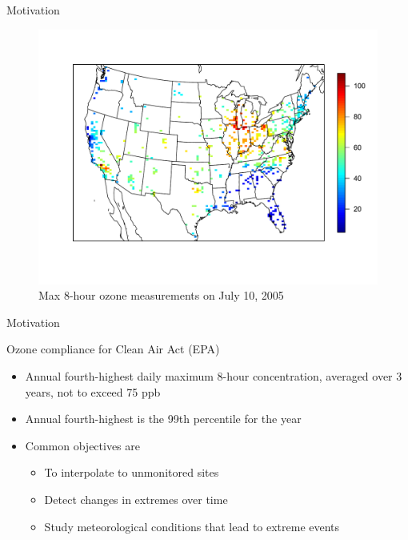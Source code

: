 \documentclass{beamer}
\begin{document}
 \begin{frame}{Motivation}
   \centering
   \begin{figure}
     \includegraphics[width=\linewidth, trim=0 1in 0 1in ]{ozone-10jul-us}
     \caption{Max 8-hour ozone measurements on July 10, 2005}
    \end{figure}
 \end{frame}

 \begin{frame}{Motivation}
 \begin{adjustwidth}{1em}{0em}
   Ozone compliance for Clean Air Act (EPA) \vspace{1em}
   \begin{itemize} \setlength{\itemsep}{1em}
     \item Annual fourth-highest daily maximum 8-hour concentration, averaged over 3 years, not to exceed 75 ppb
     \item Annual fourth-highest is the 99th percentile for the year
     \item Common objectives are \vspace{0.5em}
     \begin{itemize} \setlength{\itemsep}{0.5em}
       \item To interpolate to unmonitored sites
       \item Detect changes in extremes over time
       \item Study meteorological conditions that lead to extreme events
     \end{itemize}
   \end{itemize}
 \end{adjustwidth}
 \end{frame}
\end{document}
